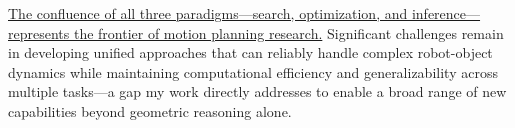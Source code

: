 \ul{The confluence of all three paradigms---search, optimization, and inference---represents the frontier of motion planning research.}
Significant challenges remain in developing unified approaches that can reliably handle complex robot-object dynamics while maintaining computational efficiency and generalizability across multiple tasks---a gap my work directly addresses to enable a broad range of new capabilities beyond geometric reasoning alone.




